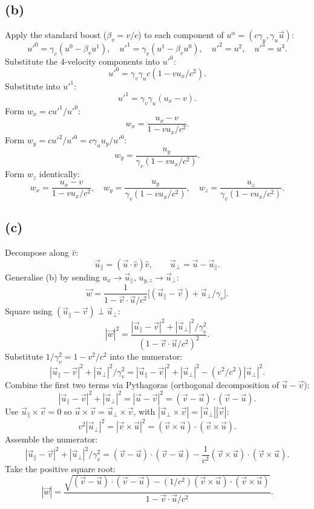\documentclass[11pt]{article}
\begin{document}
\subsection*{(b)}
Apply the standard boost ($\beta_{v}=v/c$) to each component of $u^{\alpha}=(c\gamma_{u},\gamma_{u}\vec u)$:
\[ u'^{0}=\gamma_{v}(u^{0}-\beta_{v}u^{1}),\quad u'^{1}=\gamma_{v}(u^{1}-\beta_{v}u^{0}),\quad u'^{2}=u^{2},\quad u'^{3}=u^{3}. \]
Substitute the 4-velocity components into $u'^{0}$:
\[ u'^{0}=\gamma_{v}\gamma_{u}c(1-vu_{x}/c^{2}). \]
Substitute into $u'^{1}$:
\[ u'^{1}=\gamma_{v}\gamma_{u}(u_{x}-v). \]
Form $w_{x}=cu'^{1}/u'^{0}$:
\[ w_{x}=\frac{u_{x}-v}{1-vu_{x}/c^{2}}. \]
Form $w_{y}=cu'^{2}/u'^{0}=c\gamma_{u}u_{y}/u'^{0}$:
\[ w_{y}=\frac{u_{y}}{\gamma_{v}(1-vu_{x}/c^{2})}. \]
Form $w_{z}$ identically:
\[ \boxed{\;w_{x}=\frac{u_{x}-v}{1-vu_{x}/c^{2}},\quad w_{y}=\frac{u_{y}}{\gamma_{v}(1-vu_{x}/c^{2})},\quad w_{z}=\frac{u_{z}}{\gamma_{v}(1-vu_{x}/c^{2})}.\;} \]

\subsection*{(c)}
Decompose along $\hat v$:
\[ \vec u_{\parallel}=(\vec u\cdot\hat v)\hat v,\qquad \vec u_{\perp}=\vec u-\vec u_{\parallel}. \]
Generalise (b) by sending $u_{x}\to\vec u_{\parallel}$, $u_{y,z}\to\vec u_{\perp}$:
\[ \vec w=\frac{1}{1-\vec v\cdot\vec u/c^{2}}\Big[(\vec u_{\parallel}-\vec v)+\vec u_{\perp}/\gamma_{v}\Big]. \]
Square using $(\vec u_{\parallel}-\vec v)\perp\vec u_{\perp}$:
\[ |\vec w|^{2}=\frac{|\vec u_{\parallel}-\vec v|^{2}+|\vec u_{\perp}|^{2}/\gamma_{v}^{2}}{(1-\vec v\cdot\vec u/c^{2})^{2}}. \]
Substitute $1/\gamma_{v}^{2}=1-v^{2}/c^{2}$ into the numerator:
\[ |\vec u_{\parallel}-\vec v|^{2}+|\vec u_{\perp}|^{2}/\gamma_{v}^{2}=|\vec u_{\parallel}-\vec v|^{2}+|\vec u_{\perp}|^{2}-(v^{2}/c^{2})|\vec u_{\perp}|^{2}. \]
Combine the first two terms via Pythagoras (orthogonal decomposition of $\vec u-\vec v$):
\[ |\vec u_{\parallel}-\vec v|^{2}+|\vec u_{\perp}|^{2}=|\vec u-\vec v|^{2}=(\vec v-\vec u)\cdot(\vec v-\vec u). \]
Use $\vec u_{\parallel}\times\vec v=0$ so $\vec u\times\vec v=\vec u_{\perp}\times\vec v$, with $|\vec u_{\perp}\times\vec v|=|\vec u_{\perp}||\vec v|$:
\[ v^{2}|\vec u_{\perp}|^{2}=|\vec v\times\vec u|^{2}=(\vec v\times\vec u)\cdot(\vec v\times\vec u). \]
Assemble the numerator:
\[ |\vec u_{\parallel}-\vec v|^{2}+|\vec u_{\perp}|^{2}/\gamma_{v}^{2}=(\vec v-\vec u)\cdot(\vec v-\vec u)-\frac{1}{c^{2}}(\vec v\times\vec u)\cdot(\vec v\times\vec u). \]
Take the positive square root:
\begin{equation} \boxed{\;|\vec w|=\frac{\sqrt{(\vec v-\vec u)\cdot(\vec v-\vec u)-(1/c^{2})(\vec v\times\vec u)\cdot(\vec v\times\vec u)}}{1-\vec v\cdot\vec u/c^{2}}.\;} \label{eq:w-mag} \end{equation}
\end{document}
